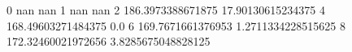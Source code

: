 0 nan nan
1 nan nan
2 186.3973388671875 17.90130615234375
4 168.49603271484375 0.0
6 169.7671661376953 1.2711334228515625
8 172.32460021972656 3.8285675048828125
